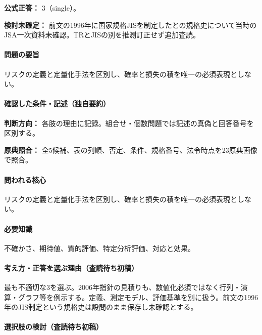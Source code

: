 \textbf{公式正答：} 3（single）。

\par\textbf{検討未確定：} 前文の1996年に国家規格JISを制定したとの規格史について当時のJSA一次資料未確認。TRとJISの別を推測訂正せず追加査読。

\paragraph{問題の要旨} リスクの定義と定量化手法を区別し、確率と損失の積を唯一の必須表現としない。

\paragraph{確認した条件・記述（独自要約）}\mbox{}\par

\noindent\textbf{判断方向：} 各肢の理由に記録。組合せ・個数問題では記述の真偽と回答番号を区別する。\par

\noindent\textbf{原典照合：} 全5候補、表の列順、否定、条件、規格番号、法令時点を23原典画像で照合。\par

\paragraph{問われる核心} リスクの定義と定量化手法を区別し、確率と損失の積を唯一の必須表現としない。

\paragraph{必要知識} 不確かさ、期待値、質的評価、特定分析評価、対応と効果。

\paragraph{考え方・正答を選ぶ理由（査読待ち初稿）} 最も不適切な3を選ぶ。2006年指針の見積りも、数値化必須ではなく行列・演算・グラフ等を例示する。定義、測定モデル、評価基準を別に扱う。前文の1996年のJIS制定という規格史は設問のまま保存し未確認とする。

\paragraph{選択肢の検討（査読待ち初稿）}\mbox{}\par

